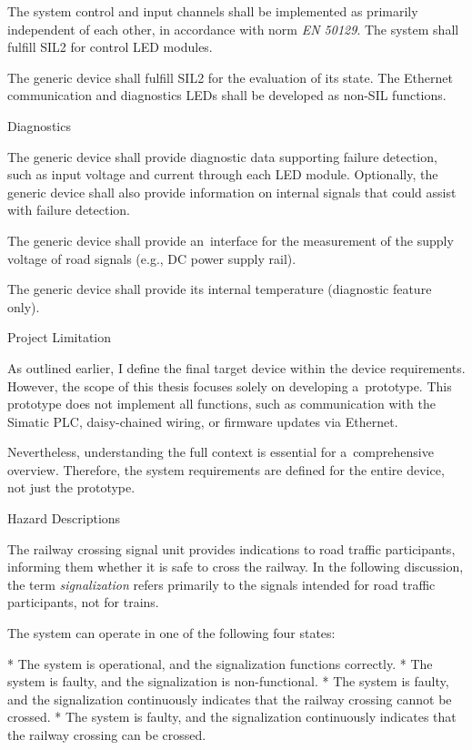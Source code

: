 The system control and input channels shall be implemented as primarily independent of each other, in accordance with norm {\it EN 50129}. The system shall fulfill SIL2 for control LED modules.

The generic device shall fulfill SIL2 for the evaluation of its state. The Ethernet communication and diagnostics LEDs shall be developed as non-SIL functions.

\secc Diagnostics

The generic device shall provide diagnostic data supporting failure detection, such as input voltage and current through each LED module. Optionally, the generic device shall also provide information on internal signals that could assist with failure detection.

The generic device shall provide an~interface for the measurement of the supply voltage of road signals (e.g., DC power supply rail).

The generic device shall provide its internal temperature (diagnostic feature only).

\secc Project Limitation

As outlined earlier, I define the final target device within the device requirements. However, the scope of this thesis focuses solely on developing a~prototype. This prototype does not implement all functions, such as communication with the Simatic PLC, daisy-chained wiring, or firmware updates via Ethernet.

Nevertheless, understanding the full context is essential for a~comprehensive overview. Therefore, the system requirements are defined for the entire device, not just the prototype.

\sec Hazard Descriptions

The railway crossing signal unit provides indications to road traffic participants, informing them whether it is safe to cross the railway. In the following discussion, the term {\it signalization} refers primarily to the signals intended for road traffic participants, not for trains.

The system can operate in one of the following four states:

\begitems
* The {\sbf system is operational}, and the signalization functions correctly.
* The system is faulty, and the {\sbf signalization is non-functional}.
* The system is faulty, and the signalization continuously indicates that the railway crossing {\sbf cannot be crossed}.
* The system is faulty, and the signalization continuously indicates that the railway crossing {\sbf can be crossed}.
\enditems

